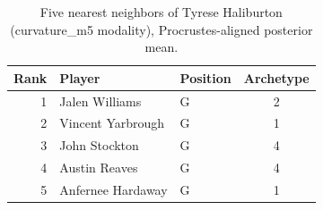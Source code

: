 \begin{table}[htbp]
  \centering\small
  \begin{tabular}{rllc}
    \toprule
    Rank & Player & Position & Archetype \\
    \midrule
    1 & Jalen Williams & G & 2 \\
    2 & Vincent Yarbrough & G & 1 \\
    3 & John Stockton & G & 4 \\
    4 & Austin Reaves & G & 4 \\
    5 & Anfernee Hardaway & G & 1 \\
    \bottomrule
  \end{tabular}
  \caption{Five nearest neighbors of Tyrese Haliburton (curvature_m5 modality), Procrustes-aligned posterior mean.}
  \label{tab:Tyrese_Haliburton_neighbors_curvature_m5}
\end{table}

